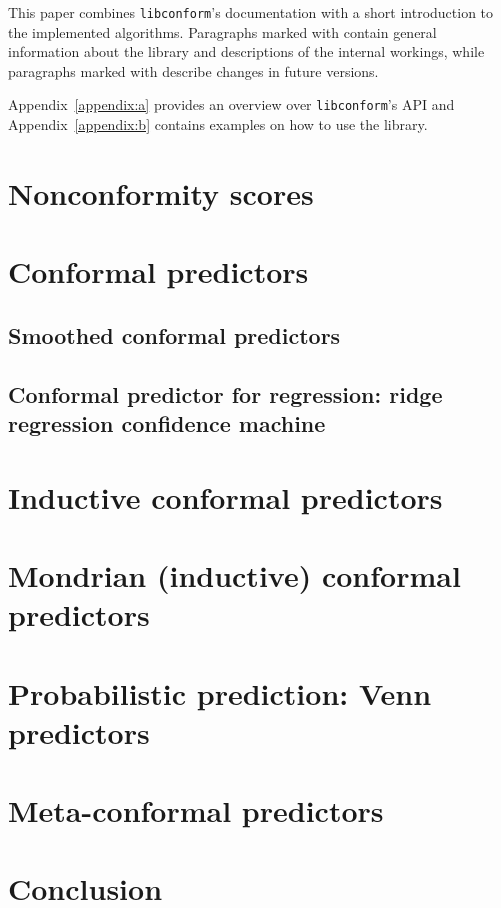 \documentclass[twoside,11pt]{article}
\def\libconform{\texttt{libconform}}
\def\info{\textcolor{blue}{\faInfo}}
\def\alert{\textcolor{red}{\faExclamation}}
\begin{document}
This paper combines \libconform{}'s documentation with a
short introduction to the implemented algorithms.
Paragraphs marked with \info{} contain general information
about the library and descriptions of the
internal workings, while paragraphs marked
with \alert{} describe changes in future versions.

Appendix~\ref{appendix:a} provides an overview over
\libconform's API and Appendix~\ref{appendix:b} contains
examples on how to use the library.


\section{Nonconformity scores}

\section{Conformal predictors}

\subsection{Smoothed conformal predictors}

\subsection{Conformal predictor for regression: ridge
            regression confidence machine}

\section{Inductive conformal predictors}

\section{Mondrian (inductive) conformal predictors}

\section{Probabilistic prediction: Venn predictors}

\section{Meta-conformal predictors}

\section{Conclusion}
\end{document}
